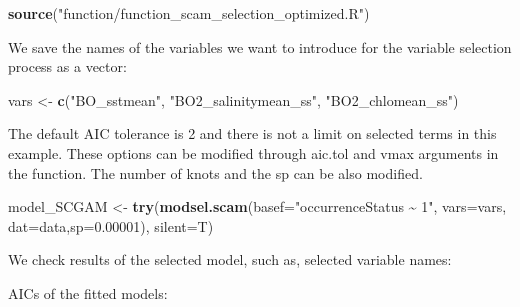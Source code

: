 \documentclass[
]{book}
\newenvironment{Shaded}{\begin{snugshade}}{\end{snugshade}}
\newcommand{\AttributeTok}[1]{\textcolor[rgb]{0.13,0.29,0.53}{#1}}
\newcommand{\FloatTok}[1]{\textcolor[rgb]{0.00,0.00,0.81}{#1}}
\newcommand{\FunctionTok}[1]{\textcolor[rgb]{0.13,0.29,0.53}{\textbf{#1}}}
\newcommand{\NormalTok}[1]{#1}
\newcommand{\OtherTok}[1]{\textcolor[rgb]{0.56,0.35,0.01}{#1}}
\newcommand{\SpecialCharTok}[1]{\textcolor[rgb]{0.81,0.36,0.00}{\textbf{#1}}}
\newcommand{\StringTok}[1]{\textcolor[rgb]{0.31,0.60,0.02}{#1}}
\begin{document}
\begin{Shaded}
\begin{Highlighting}[]
\FunctionTok{source}\NormalTok{(}\StringTok{"function/function\_scam\_selection\_optimized.R"}\NormalTok{)}
\end{Highlighting}
\end{Shaded}

We save the names of the variables we want to introduce for the variable selection process as a vector:

\begin{Shaded}
\begin{Highlighting}[]
\NormalTok{vars }\OtherTok{\textless{}{-}} \FunctionTok{c}\NormalTok{(}\StringTok{"BO\_sstmean"}\NormalTok{,}
          \StringTok{"BO2\_salinitymean\_ss"}\NormalTok{,}
          \StringTok{"BO2\_chlomean\_ss"}\NormalTok{)}
\end{Highlighting}
\end{Shaded}

The default AIC tolerance is 2 and there is not a limit on selected terms in this example. These options can be modified through aic.tol and vmax arguments in the function. The number of knots and the sp can be also modified.

\begin{Shaded}
\begin{Highlighting}[]
\NormalTok{model\_SCGAM }\OtherTok{\textless{}{-}} \FunctionTok{try}\NormalTok{(}\FunctionTok{modsel.scam}\NormalTok{(}\AttributeTok{basef=}\StringTok{"occurrenceStatus \textasciitilde{} 1"}\NormalTok{, }\AttributeTok{vars=}\NormalTok{vars, }\AttributeTok{dat=}\NormalTok{data,}\AttributeTok{sp=}\FloatTok{0.00001}\NormalTok{), }\AttributeTok{silent=}\NormalTok{T)  }
\end{Highlighting}
\end{Shaded}

We check results of the selected model, such as, selected variable names:

\begin{Shaded}
\end{Shaded}

AICs of the fitted models:

\begin{Shaded}
\end{Shaded}
\end{document}
